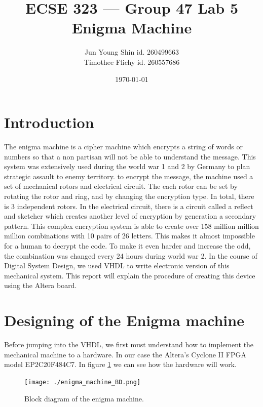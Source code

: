 \documentclass[10pt]{article}
\title{ECSE 323 --- Group 47 Lab 5 Enigma Machine}
\author{Jun Young Shin id. 260499663\\ Timothee Flichy id. 260557686}
\date{\today}
\begin{document}
\maketitle
\section{Introduction}
The enigma machine is a cipher machine which encrypts a string of words or numbers so that a non partisan will not be able to understand the message. This system was extensively used during the world war 1 and 2 by Germany to plan strategic assault to enemy territory. to encrypt the message, the machine used a set of mechanical rotors and electrical circuit. The each rotor can be set by rotating the rotor and ring, and by changing the encryption type. In total, there is 3 independent rotors. In the electrical circuit, there is a circuit called a reflect and sketcher which creates another level of encryption by generation a secondary pattern. This complex encryption system is able to create over 158 million million million combinations with 10 pairs of 26 letters. This makes it almost impossible for a human to decrypt the code. To make it even harder and increase the odd, the combination was changed every 24 hours during world war 2. In the course of Digital System Design, we used VHDL to write electronic version of this mechanical system. This report will explain the procedure of creating this device using the Altera board.

\section{Designing of the Enigma machine}
Before jumping into the VHDL, we first must understand how to implement the mechanical machine to a hardware. In our case the Altera's Cyclone II FPGA model EP2C20F484C7. In figure \ref{fig:enigma_machine_BD} we can see how the hardware will work.
\begin{figure}[!htb]
    \centering
    \texttt{[image: ./enigma\_machine\_BD.png]}
    \caption{Block diagram of the enigma machine.}
    \label{fig:enigma_machine_BD}
\end{figure}
\end{document}
